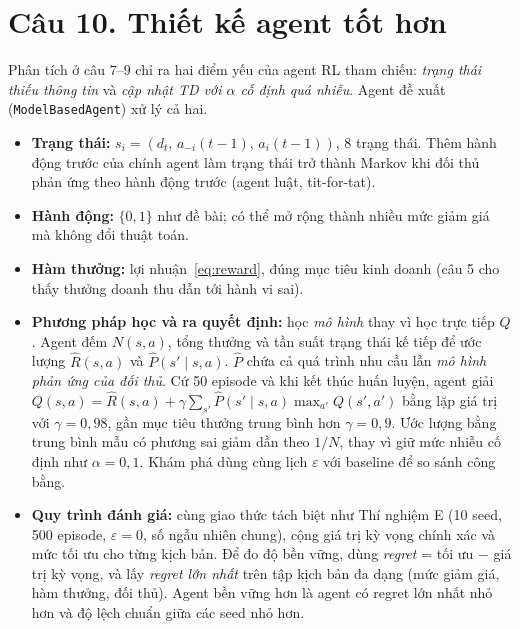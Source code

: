 \documentclass[12pt,a4paper]{report}
\newcommand{\SRC}{../agent02_experiment.py}
\newcommand{\CodeLines}[2]{\VerbatimInput[fontsize=\scriptsize,frame=single,
  breaklines=true,numbers=left,numbersep=4pt,firstline=#1,lastline=#2,
  baselinestretch=1.0]{\SRC}}
\begin{document}
\section*{Câu 10. Thiết kế agent tốt hơn}
Phân tích ở câu 7--9 chỉ ra hai điểm yếu của agent RL tham chiếu: \emph{trạng thái
thiếu thông tin} và \emph{cập nhật TD với $\alpha$ cố định quá nhiễu}. Agent đề xuất
(\texttt{ModelBasedAgent}) xử lý cả hai.

\begin{itemize}
\item \textbf{Trạng thái:} $s_i=(d_t,\,a_{-i}(t-1),\,a_i(t-1))$, 8 trạng thái. Thêm
  hành động trước của chính agent làm trạng thái trở thành Markov khi đối thủ phản
  ứng theo hành động trước (agent luật, tit-for-tat).
\item \textbf{Hành động:} $\{0,1\}$ như đề bài; có thể mở rộng thành nhiều mức giảm
  giá mà không đổi thuật toán.
\item \textbf{Hàm thưởng:} lợi nhuận~\eqref{eq:reward}, đúng mục tiêu kinh doanh
  (câu 5 cho thấy thưởng doanh thu dẫn tới hành vi sai).
\item \textbf{Phương pháp học và ra quyết định:} học \emph{mô hình} thay vì học trực
  tiếp $Q$. Agent đếm $N(s,a)$, tổng thưởng và tần suất trạng thái kế tiếp để ước
  lượng $\hat R(s,a)$ và $\hat P(s'\mid s,a)$. $\hat P$ chứa cả quá trình nhu cầu lẫn
  \emph{mô hình phản ứng của đối thủ}. Cứ 50 episode và khi kết thúc huấn luyện,
  agent giải $Q(s,a)=\hat R(s,a)+\gamma\sum_{s'}\hat P(s'\mid s,a)\max_{a'}Q(s',a')$
  bằng lặp giá trị với $\gamma=0{,}98$, gần mục tiêu thưởng trung bình hơn
  $\gamma=0{,}9$. Ước lượng bằng trung bình mẫu có phương sai giảm dần theo $1/N$,
  thay vì giữ mức nhiễu cố định như $\alpha=0{,}1$. Khám phá dùng cùng lịch
  $\varepsilon$ với baseline để so sánh công bằng.
\item \textbf{Quy trình đánh giá:} cùng giao thức tách biệt như Thí nghiệm E (10
  seed, 500 episode, $\varepsilon=0$, số ngẫu nhiên chung), cộng giá trị kỳ vọng
  chính xác và mức tối ưu cho từng kịch bản. Để đo độ bền vững, dùng
  \emph{regret} = tối ưu $-$ giá trị kỳ vọng, và lấy \emph{regret lớn nhất} trên tập
  kịch bản đa dạng (mức giảm giá, hàm thưởng, đối thủ). Agent bền vững hơn là agent
  có regret lớn nhất nhỏ hơn và độ lệch chuẩn giữa các seed nhỏ hơn.
\end{itemize}

\CodeLines{342}{403}
\end{document}
